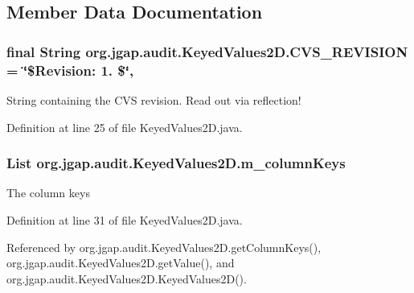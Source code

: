 \subsection{Member Data Documentation}
\hypertarget{classorg_1_1jgap_1_1audit_1_1_keyed_values2_d_ad086a0c622fe90f593c56161f3c2f53a}{
\subsubsection[{C\-V\-S\-\_\-\-R\-E\-V\-I\-S\-I\-O\-N}]{\setlength{\rightskip}{0pt plus 5cm}final String org.\-jgap.\-audit.\-Keyed\-Values2\-D.\-C\-V\-S\-\_\-\-R\-E\-V\-I\-S\-I\-O\-N = \char`\"{}\$Revision\-: 1. \$\char`\"{}\hspace{0.3cm}{\ttfamily [static]}, {\ttfamily [private]}}}\label{classorg_1_1jgap_1_1audit_1_1_keyed_values2_d_ad086a0c622fe90f593c56161f3c2f53a}
String containing the C\-V\-S revision. Read out via reflection! 

Definition at line 25 of file Keyed\-Values2\-D.\-java.

\hypertarget{classorg_1_1jgap_1_1audit_1_1_keyed_values2_d_a5be5d5ef6399fad7b5d6d3962d8b4e64}{
\subsubsection[{m\-\_\-column\-Keys}]{\setlength{\rightskip}{0pt plus 5cm}List org.\-jgap.\-audit.\-Keyed\-Values2\-D.\-m\-\_\-column\-Keys\hspace{0.3cm}{\ttfamily [private]}}}\label{classorg_1_1jgap_1_1audit_1_1_keyed_values2_d_a5be5d5ef6399fad7b5d6d3962d8b4e64}
The column keys 

Definition at line 31 of file Keyed\-Values2\-D.\-java.



Referenced by org.\-jgap.\-audit.\-Keyed\-Values2\-D.\-get\-Column\-Keys(), org.\-jgap.\-audit.\-Keyed\-Values2\-D.\-get\-Value(), and org.\-jgap.\-audit.\-Keyed\-Values2\-D.\-Keyed\-Values2\-D().

